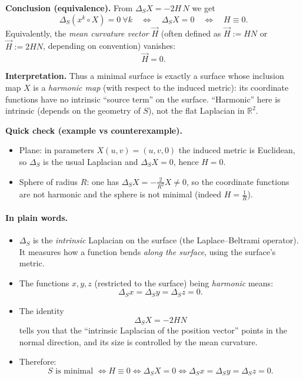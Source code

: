\documentclass[12pt,a4paper]{article}
\theoremstyle{plain}
\theoremstyle{definition}      %
\begin{document}
\medskip
\textbf{Conclusion (equivalence).}
From $\Delta_S X = -2H\,N$ we get
\[
\Delta_S(x^k\circ X)=0\ \forall k
\quad\Longleftrightarrow\quad
\Delta_S X=0
\quad\Longleftrightarrow\quad
H\equiv 0.
\]
Equivalently, the \emph{mean curvature vector} $\vec H$ (often defined as $\vec H := HN$ or $\vec H:=2HN$,
depending on convention) vanishes:
\[
\vec H=0.
\]

\medskip
\textbf{Interpretation.}
Thus a minimal surface is exactly a surface whose inclusion map $X$ is a \emph{harmonic map}
(with respect to the induced metric): its coordinate functions have no intrinsic ``source term'' on the surface.
``Harmonic'' here is intrinsic (depends on the geometry of $S$), not the flat Laplacian in $\mathbb{R}^2$.

\medskip
\textbf{Quick check (example vs counterexample).}
\begin{itemize}
	\item Plane: in parameters $X(u,v)=(u,v,0)$ the induced metric is Euclidean, so $\Delta_S$ is the usual Laplacian
	and $\Delta_S X=0$, hence $H=0$.
	\item Sphere of radius $R$: one has $\Delta_S X = -\frac{2}{R^2}X\neq 0$, so the coordinate functions are not harmonic
	and the sphere is not minimal (indeed $H=\frac{1}{R}$).
\end{itemize}

\paragraph{In plain words.}
\begin{itemize}
	\item $\Delta_S$ is the \emph{intrinsic} Laplacian on the surface (the Laplace--Beltrami operator).  
	It measures how a function bends \emph{along the surface}, using the surface's metric.
	
	\item The functions $x,y,z$ (restricted to the surface) being \emph{harmonic} means:
	\[
	\Delta_S x=\Delta_S y=\Delta_S z=0.
	\]
	
	\item The identity
	\[
	\Delta_S X=-2HN
	\]
	tells you that the ``intrinsic Laplacian of the position vector'' points in the normal direction,
	and its size is controlled by the mean curvature.
	
	\item Therefore:
	\[
	S \text{ is minimal } \Longleftrightarrow H\equiv 0
	\Longleftrightarrow \Delta_S X=0
	\Longleftrightarrow \Delta_S x=\Delta_S y=\Delta_S z=0.
	\]
\end{itemize}
\end{document}
